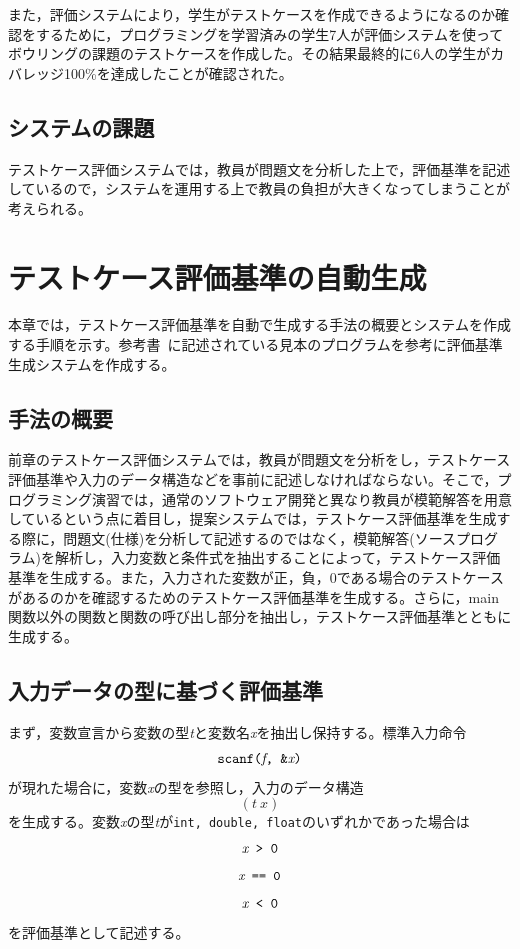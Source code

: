 \documentclass{tpu-sotu}
\begin{document}
また，評価システムにより，学生がテストケースを作成できるようになるのか確認をするために，プログラミングを学習済みの学生7人が評価システムを使ってボウリングの課題のテストケースを作成した。その結果最終的に6人の学生がカバレッジ100\%を達成したことが確認された。

\section{システムの課題}
テストケース評価システムでは，教員が問題文を分析した上で，評価基準を記述しているので，システムを運用する上で教員の負担が大きくなってしまうことが考えられる。

\chapter{テストケース評価基準の自動生成}
本章では，テストケース評価基準を自動で生成する手法の概要とシステムを作成する手順を示す。参考書~\cite{b1}に記述されている見本のプログラムを参考に評価基準生成システムを作成する。

\section{手法の概要}
前章のテストケース評価システムでは，教員が問題文を分析をし，テストケース評価基準や入力のデータ構造などを事前に記述しなければならない。そこで，プログラミング演習では，通常のソフトウェア開発と異なり教員が模範解答を用意しているという点に着目し，提案システムでは，テストケース評価基準を生成する際に，問題文(仕様)を分析して記述するのではなく，模範解答(ソースプログラム)を解析し，入力変数と条件式を抽出することによって，テストケース評価基準を生成する。また，入力された変数が正，負，0である場合のテストケースがあるのかを確認するためのテストケース評価基準を生成する。さらに，main関数以外の関数と関数の呼び出し部分を抽出し，テストケース評価基準とともに生成する。

\section{入力データの型に基づく評価基準}
まず，変数宣言から変数の型{\it t}と変数名{\it x}を抽出し保持する。標準入力命令\\
\[ 
\mbox{{\tt {scanf({\it f}, \&{\it x})}}}
\]
が現れた場合に，変数{\it x}の型を参照し，入力のデータ構造\\
\[
(t\:x)
\]
を生成する。変数{\it x}の型{\it t}が{\tt int, double, float}のいずれかであった場合は\\
\[ 
\mbox{\tt{{\it x} > 0}} 
\]
\[
\mbox{\tt{{\it x} == 0}}
\]
\[
\mbox{\tt{{\it x} < 0}}
\]
を評価基準として記述する。
\end{document}
